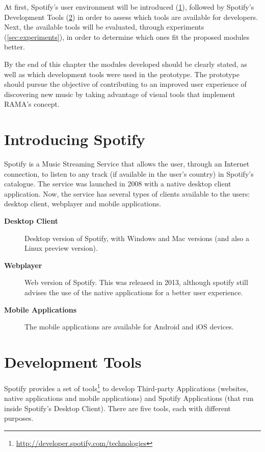 At first, Spotify's user environment will be introduced (\ref{sec:spotify}), followed by Spotify's Development Tools (\ref{sec:devtools}) in order to assess which tools are available for developers.
Next, the available tools will be evaluated, through experiments (\ref{sec:experiments}), in order to determine which ones fit the proposed modules better.

By the end of this chapter the modules developed should be clearly stated, as well as which development tools were used in the prototype.
The prototype should pursue the objective of contributing to an improved user experience of discovering new music by taking advantage of visual tools that implement RAMA's concept.

\section{Introducing Spotify} %
\label{sec:spotify}

  Spotify is a Music Streaming Service that allows the user, through an Internet connection, to listen to any track (if available in the user's country) in Spotify's catalogue.
  The service was launched in 2008 with a native desktop client application.
  Now, the service has several types of clients available to the users: desktop client, webplayer and mobile applications.

  \begin{description}
    \item[\textbf{Desktop Client}] Desktop version of Spotify, with Windows and Mac versions (and also a Linux preview version).
    \item[\textbf{Webplayer}] Web version of Spotify. This was released in 2013, although spotify still advises the use of the native applications for a better user experience.
    \item[\textbf{Mobile Applications}] The mobile applications are available for Android and iOS devices.
  \end{description}


  \section{Development Tools} %
  \label{sec:devtools}
  
    Spotify provides a set of tools\footnote{\url{http://developer.spotify.com/technologies}} to develop Third-party Applications (websites, native applications and mobile applications) and Spotify Applications (that run inside Spotify's Desktop Client).
    There are five tools, each with different purposes.

